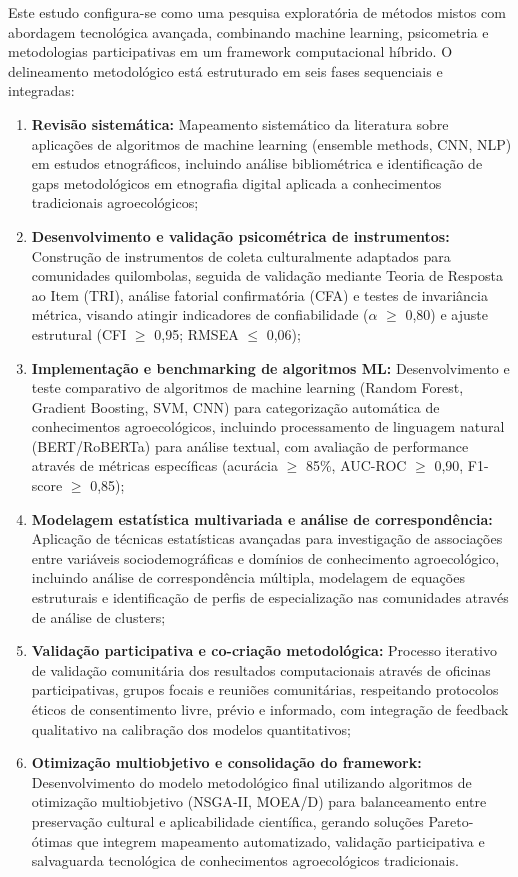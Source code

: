Este estudo configura-se como uma pesquisa exploratória de métodos mistos com abordagem tecnológica avançada, combinando machine learning, psicometria e metodologias participativas em um framework computacional híbrido. O delineamento metodológico está estruturado em seis fases sequenciais e integradas:

\begin{enumerate}[label=\bfseries(\Roman*)] 
  \item \textbf{Revisão sistemática:} Mapeamento sistemático da literatura sobre aplicações de algoritmos de machine learning (ensemble methods, CNN, NLP) em estudos etnográficos, incluindo análise bibliométrica e identificação de gaps metodológicos em etnografia digital aplicada a conhecimentos tradicionais agroecológicos;
  
  \item \textbf{Desenvolvimento e validação psicométrica de instrumentos:} Construção de instrumentos de coleta culturalmente adaptados para comunidades quilombolas, seguida de validação mediante Teoria de Resposta ao Item (TRI), análise fatorial confirmatória (CFA) e testes de invariância métrica, visando atingir indicadores de confiabilidade ($\alpha$ $\geq$ 0,80) e ajuste estrutural (CFI $\geq$ 0,95; RMSEA $\leq$ 0,06);
  
  \item \textbf{Implementação e benchmarking de algoritmos ML:} Desenvolvimento e teste comparativo de algoritmos de machine learning (Random Forest, Gradient Boosting, SVM, CNN) para categorização automática de conhecimentos agroecológicos, incluindo processamento de linguagem natural (BERT/RoBERTa) para análise textual, com avaliação de performance através de métricas específicas (acurácia $\geq$ 85\%, AUC-ROC $\geq$ 0,90, F1-score $\geq$ 0,85);
  
  \item \textbf{Modelagem estatística multivariada e análise de correspondência:} Aplicação de técnicas estatísticas avançadas para investigação de associações entre variáveis sociodemográficas e domínios de conhecimento agroecológico, incluindo análise de correspondência múltipla, modelagem de equações estruturais e identificação de perfis de especialização nas comunidades através de análise de clusters;
  
  \item \textbf{Validação participativa e co-criação metodológica:} Processo iterativo de validação comunitária dos resultados computacionais através de oficinas participativas, grupos focais e reuniões comunitárias, respeitando protocolos éticos de consentimento livre, prévio e informado, com integração de feedback qualitativo na calibração dos modelos quantitativos;
  
  \item \textbf{Otimização multiobjetivo e consolidação do framework:} Desenvolvimento do modelo metodológico final utilizando algoritmos de otimização multiobjetivo (NSGA-II, MOEA/D) para balanceamento entre preservação cultural e aplicabilidade científica, gerando soluções Pareto-ótimas que integrem mapeamento automatizado, validação participativa e salvaguarda tecnológica de conhecimentos agroecológicos tradicionais.
\end{enumerate}

